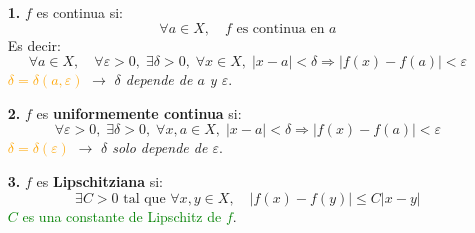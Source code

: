 \begin{itemize}
	\item[\textbf{1.}] \( f \) es continua si:
	      \[
		      \forall a \in X, \quad f \text{ es continua en } a
	      \]
	      Es decir:
	      \[
		      \forall a \in X, \quad \forall \varepsilon > 0, \; \exists \delta > 0, \; \forall x \in X, \; \lvert x - a \rvert < \delta \Rightarrow \lvert f(x) - f(a) \rvert < \varepsilon
	      \]
	      \textcolor{orange}{\(\delta = \delta(a, \varepsilon)\)} $\rightarrow$ \textit{\(\delta\) depende de \(a\) y \(\varepsilon\)}.

	\item[\textbf{2.}] \( f \) es \textbf{uniformemente continua} si:
	      \[
		      \forall \varepsilon > 0, \; \exists \delta > 0, \; \forall x, a \in X, \; \lvert x - a \rvert < \delta \Rightarrow \lvert f(x) - f(a) \rvert < \varepsilon
	      \]
	      \textcolor{orange}{\(\delta = \delta(\varepsilon)\)} $\rightarrow$ \textit{\(\delta\) solo depende de \(\varepsilon\)}.

	\item[\textbf{3.}] \( f \) es \textbf{Lipschitziana} si:
	      \[
		      \exists C > 0 \text{ tal que } \forall x, y \in X, \quad \lvert f(x) - f(y) \rvert \leq C \lvert x - y \rvert
	      \]
	      \textcolor{green}{\(C\) es una constante de Lipschitz de \(f\)}.

\end{itemize}



